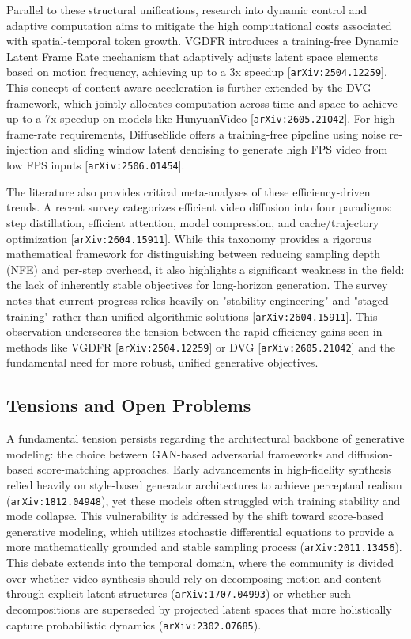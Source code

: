 \documentclass[11pt]{article}
\begin{document}
Parallel to these structural unifications, research into dynamic control and adaptive computation aims to mitigate the high computational costs associated with spatial-temporal token growth. VGDFR introduces a training-free Dynamic Latent Frame Rate mechanism that adaptively adjusts latent space elements based on motion frequency, achieving up to a 3x speedup [\texttt{arXiv:2504.12259}]. This concept of content-aware acceleration is further extended by the DVG framework, which jointly allocates computation across time and space to achieve up to a 7x speedup on models like HunyuanVideo [\texttt{arXiv:2605.21042}]. For high-frame-rate requirements, DiffuseSlide offers a training-free pipeline using noise re-injection and sliding window latent denoising to generate high FPS video from low FPS inputs [\texttt{arXiv:2506.01454}].

The literature also provides critical meta-analyses of these efficiency-driven trends. A recent survey categorizes efficient video diffusion into four paradigms: step distillation, efficient attention, model compression, and cache/trajectory optimization [\texttt{arXiv:2604.15911}]. While this taxonomy provides a rigorous mathematical framework for distinguishing between reducing sampling depth (NFE) and per-step overhead, it also highlights a significant weakness in the field: the lack of inherently stable objectives for long-horizon generation. The survey notes that current progress relies heavily on "stability engineering" and "staged training" rather than unified algorithmic solutions [\texttt{arXiv:2604.15911}]. This observation underscores the tension between the rapid efficiency gains seen in methods like VGDFR [\texttt{arXiv:2504.12259}] or DVG [\texttt{arXiv:2605.21042}] and the fundamental need for more robust, unified generative objectives.

\subsection{Tensions and Open Problems}

A fundamental tension persists regarding the architectural backbone of generative modeling: the choice between GAN-based adversarial frameworks and diffusion-based score-matching approaches. Early advancements in high-fidelity synthesis relied heavily on style-based generator architectures to achieve perceptual realism (\texttt{arXiv:1812.04948}), yet these models often struggled with training stability and mode collapse. This vulnerability is addressed by the shift toward score-based generative modeling, which utilizes stochastic differential equations to provide a more mathematically grounded and stable sampling process (\texttt{arXiv:2011.13456}). This debate extends into the temporal domain, where the community is divided over whether video synthesis should rely on decomposing motion and content through explicit latent structures (\texttt{arXiv:1707.04993}) or whether such decompositions are superseded by projected latent spaces that more holistically capture probabilistic dynamics (\texttt{arXiv:2302.07685}).
\end{document}
